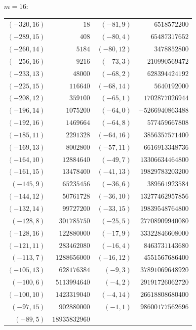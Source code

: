 \noindent$m=16$:\nopagebreak\\[2pt]
{\scriptsize\begin{tabular}{@{}r@{\ \ }r@{\qquad}r@{\ \ }r@{}}
$(-320,16)$ & $18$ & $(-81,9)$ & $6518572200$ \\
$(-289,15)$ & $408$ & $(-80,4)$ & $65487317652$ \\
$(-260,14)$ & $5184$ & $(-80,12)$ & $3478852800$ \\
$(-256,16)$ & $9216$ & $(-73,3)$ & $210990569472$ \\
$(-233,13)$ & $48000$ & $(-68,2)$ & $628394424192$ \\
$(-225,15)$ & $116640$ & $(-68,14)$ & $5640192000$ \\
$(-208,12)$ & $359100$ & $(-65,1)$ & $1702877026944$ \\
$(-196,14)$ & $1075200$ & $(-64,0)$ & $-5266940863488$ \\
$(-192,16)$ & $1469664$ & $(-64,8)$ & $577459667808$ \\
$(-185,11)$ & $2291328$ & $(-64,16)$ & $3856357571400$ \\
$(-169,13)$ & $8002800$ & $(-57,11)$ & $6616913348736$ \\
$(-164,10)$ & $12884640$ & $(-49,7)$ & $13306634464800$ \\
$(-161,15)$ & $13478400$ & $(-41,13)$ & $19829783203200$ \\
$(-145,9)$ & $65235456$ & $(-36,6)$ & $389561923584$ \\
$(-144,12)$ & $50761728$ & $(-36,10)$ & $13277462957856$ \\
$(-132,14)$ & $99727200$ & $(-33,15)$ & $19839548764800$ \\
$(-128,8)$ & $301785750$ & $(-25,5)$ & $27708909940080$ \\
$(-128,16)$ & $122880000$ & $(-17,9)$ & $33322846608000$ \\
$(-121,11)$ & $283462080$ & $(-16,4)$ & $8463731143680$ \\
$(-113,7)$ & $1288656000$ & $(-16,12)$ & $4551567686400$ \\
$(-105,13)$ & $628176384$ & $(-9,3)$ & $37891069648920$ \\
$(-100,6)$ & $5113994640$ & $(-4,2)$ & $29191726062720$ \\
$(-100,10)$ & $1423319040$ & $(-4,14)$ & $26618808680400$ \\
$(-97,15)$ & $902880000$ & $(-1,1)$ & $98600177562696$ \\
$(-89,5)$ & $18935832960$ & & \\
\end{tabular}}\par\medskip
